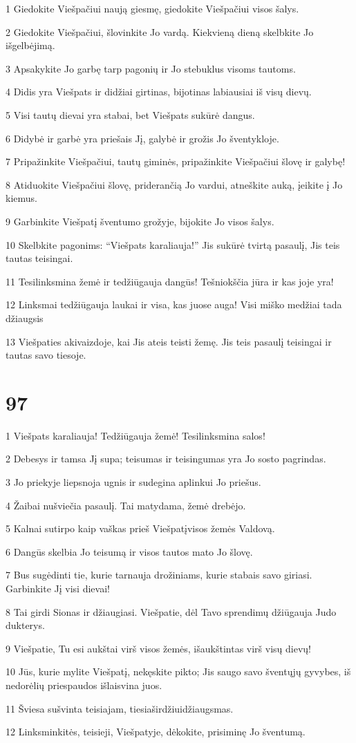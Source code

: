 \par 1 Giedokite Viešpačiui naują giesmę, giedokite Viešpačiui visos šalys. 
\par 2 Giedokite Viešpačiui, šlovinkite Jo vardą. Kiekvieną dieną skelbkite Jo išgelbėjimą. 
\par 3 Apsakykite Jo garbę tarp pagonių ir Jo stebuklus visoms tautoms. 
\par 4 Didis yra Viešpats ir didžiai girtinas, bijotinas labiausiai iš visų dievų. 
\par 5 Visi tautų dievai yra stabai, bet Viešpats sukūrė dangus. 
\par 6 Didybė ir garbė yra priešais Jį, galybė ir grožis Jo šventykloje. 
\par 7 Pripažinkite Viešpačiui, tautų giminės, pripažinkite Viešpačiui šlovę ir galybę! 
\par 8 Atiduokite Viešpačiui šlovę, priderančią Jo vardui, atneškite auką, įeikite į Jo kiemus. 
\par 9 Garbinkite Viešpatį šventumo grožyje, bijokite Jo visos šalys. 
\par 10 Skelbkite pagonims: “Viešpats karaliauja!” Jis sukūrė tvirtą pasaulį, Jis teis tautas teisingai. 
\par 11 Tesilinksmina žemė ir tedžiūgauja dangūs! Tešniokščia jūra ir kas joje yra! 
\par 12 Linksmai tedžiūgauja laukai ir visa, kas juose auga! Visi miško medžiai tada džiaugsis 
\par 13 Viešpaties akivaizdoje, kai Jis ateis teisti žemę. Jis teis pasaulį teisingai ir tautas savo tiesoje.


\chapter{97}


\par 1 Viešpats karaliauja! Tedžiūgauja žemė! Tesilinksmina salos! 
\par 2 Debesys ir tamsa Jį supa; teisumas ir teisingumas yra Jo sosto pagrindas. 
\par 3 Jo priekyje liepsnoja ugnis ir sudegina aplinkui Jo priešus. 
\par 4 Žaibai nušviečia pasaulį. Tai matydama, žemė drebėjo. 
\par 5 Kalnai sutirpo kaip vaškas prieš Viešpatį­visos žemės Valdovą. 
\par 6 Dangūs skelbia Jo teisumą ir visos tautos mato Jo šlovę. 
\par 7 Bus sugėdinti tie, kurie tarnauja drožiniams, kurie stabais savo giriasi. Garbinkite Jį visi dievai! 
\par 8 Tai girdi Sionas ir džiaugiasi. Viešpatie, dėl Tavo sprendimų džiūgauja Judo dukterys. 
\par 9 Viešpatie, Tu esi aukštai virš visos žemės, išaukštintas virš visų dievų! 
\par 10 Jūs, kurie mylite Viešpatį, nekęskite pikto; Jis saugo savo šventųjų gyvybes, iš nedorėlių priespaudos išlaisvina juos. 
\par 11 Šviesa sušvinta teisiajam, tiesiaširdžiui­džiaugsmas. 
\par 12 Linksminkitės, teisieji, Viešpatyje, dėkokite, prisiminę Jo šventumą.


